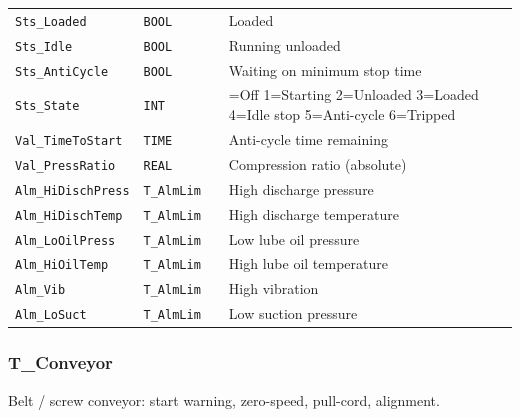 {\begin{longtable}{@{}>{\raggedright\arraybackslash}p{3.4cm}>{\raggedright\arraybackslash}p{3.3cm}>{\raggedright\arraybackslash}p{1.3cm}>{\raggedright\arraybackslash}p{6.4cm}@{}}
\texttt{Sts\_Loaded} & \texttt{BOOL} &  & Loaded \\
\texttt{Sts\_Idle} & \texttt{BOOL} &  & Running unloaded \\
\texttt{Sts\_AntiCycle} & \texttt{BOOL} &  & Waiting on minimum stop time \\
\texttt{Sts\_State} & \texttt{INT} &  & 0=Off 1=Starting 2=Unloaded 3=Loaded 4=Idle stop 5=Anti-cycle 6=Tripped \\
\texttt{Val\_TimeToStart} & \texttt{TIME} &  & Anti-cycle time remaining \\
\texttt{Val\_PressRatio} & \texttt{REAL} &  & Compression ratio (absolute) \\
\texttt{Alm\_HiDischPress} & \texttt{T\_AlmLim} &  & High discharge pressure \\
\texttt{Alm\_HiDischTemp} & \texttt{T\_AlmLim} &  & High discharge temperature \\
\texttt{Alm\_LoOilPress} & \texttt{T\_AlmLim} &  & Low lube oil pressure \\
\texttt{Alm\_HiOilTemp} & \texttt{T\_AlmLim} &  & High lube oil temperature \\
\texttt{Alm\_Vib} & \texttt{T\_AlmLim} &  & High vibration \\
\texttt{Alm\_LoSuct} & \texttt{T\_AlmLim} &  & Low suction pressure \\
\bottomrule
\end{longtable}
}
\subsubsection*{T\_Conveyor}
\label{app:pclib:tconveyor}
Belt /\allowbreak{} screw conveyor: start warning, zero-speed, pull-cord, alignment.


